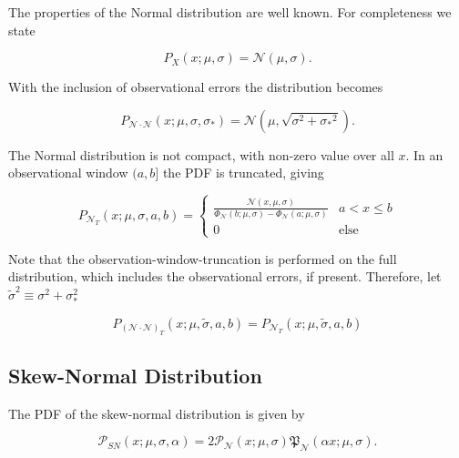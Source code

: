 \documentclass[twocolumn]{aastex631}
\newcommand{\mfk}[1]{\mathfrak{#1}}
\newcommand{\mcal}[1]{\mathcal{#1}}
\newcommand{\pdf}{\mcal{P}}
\newcommand{\cdf}{\mfk{P}}
\newcommand{\sigobs}{{\sigma_*}}
\begin{document}
        The properties of the Normal distribution are well known. For completeness we state

        \begin{equation}
            P_X(x; \mu, \sigma) = \mcal{N}(\mu, \sigma).
        \end{equation}

        With the inclusion of observational errors the distribution becomes

        \begin{equation}
            P_{\mcal{N}\cdot\mcal{N}}(x; \mu, \sigma, \sigobs) = \mcal{N}(\mu, \sqrt{\sigma^2 + \sigobs^2}).
        \end{equation}

        The Normal distribution is not compact, with non-zero value over all $x$. In an observational window $(a,b]$ the PDF is truncated, giving

        \begin{equation}
            P_{\mcal{N}_T}(x; \mu, \sigma, a, b) = \begin{cases}
                \frac{\mcal{N}(x, \mu, \sigma)}{\Phi_\mcal{N}(b; \mu, \sigma) - \Phi_\mcal{N}(a; \mu, \sigma)} & a < x \leq b \\
                0 & \text{else}
            \end{cases}
        \end{equation}

        Note that the observation-window-truncation is performed on the full distribution, which includes the observational errors, if present.
        Therefore, let $\tilde{\sigma}^2 \equiv \sigma^2+\sigma_*^2$

        \begin{equation}
            P_{(\mcal{N}\cdot\mcal{N})_T}(x; \mu, \tilde{\sigma}, a, b) = P_{\mcal{N}_T}(x; \mu, \tilde{\sigma}, a, b)
        \end{equation}

    \vspace{10pt}
    \subsection{Skew-Normal Distribution}

        The PDF of the skew-normal distribution is given by

        \begin{equation}
            \pdf_{SN}(x;\mu,\sigma,\alpha) = 2\pdf_{\mcal{N}}(x;\mu,\sigma)\cdf_{\mcal{N}}(\alpha x;\mu,\sigma).
        \end{equation}
\end{document}
